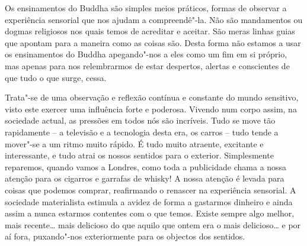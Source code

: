 Os ensinamentos do Buddha são simples meios práticos, formas de observar a
experiência sensorial que nos ajudam a compreendê"-la. Não são
mandamentos ou dogmas religiosos nos quais temos de acreditar e aceitar.
São meras linhas guias que apontam para a maneira como as coisas são.
Desta forma não estamos a usar os ensinamentos do Buddha apegando"-nos a
eles como um fim em si próprio, mas apenas para nos relembrarmos de
estar despertos, alertas e conscientes de que tudo o que surge, cessa.

Trata"-se de uma observação e reflexão contínua e constante do mundo
sensitivo, visto este exercer uma influência forte e poderosa. Vivendo
num corpo assim, na sociedade actual, as pressões em todos nós são
incríveis. Tudo se move tão rapidamente -- a televisão e a tecnologia
desta era, os carros -- tudo tende a mover"-se a um ritmo muito rápido. É
tudo muito atraente, excitante e interessante, e tudo atrai os nossos
sentidos para o exterior. Simplesmente reparemos, quando vamos a
Londres, como toda a publicidade chama a nossa atenção para os cigarros
e garrafas de whisky! A nossa atenção é levada para coisas que podemos
comprar, reafirmando o renascer na experiência sensorial. A sociedade
materialista estimula a avidez de forma a gastarmos dinheiro e ainda
assim a nunca estarmos contentes com o que temos. Existe sempre algo
melhor, mais recente\ldots{} mais delicioso do que aquilo que ontem era
o mais delicioso\ldots{} e por aí fora, puxando"-nos
exteriormente para os objectos dos sentidos.

